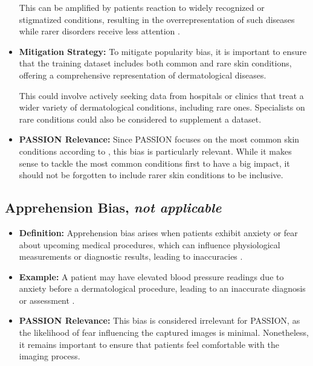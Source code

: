 \documentclass[12pt, a4paper, oneside]{book}   	%
\begin{document}
\begin{appendices}
\begin{itemize}
			This can be amplified by patients reaction to widely recognized or stigmatized conditions, resulting in the overrepresentation of such diseases while rarer disorders receive less attention \autocite{Chakraborty_2024}.
			\item \textbf{Mitigation Strategy:} To mitigate popularity bias, it is important to ensure that the training dataset includes both common and rare skin conditions, offering a comprehensive representation of dermatological diseases.
			
			This could involve actively seeking data from hospitals or clinics that treat a wider variety of dermatological conditions, including rare ones. Specialists on rare conditions could also be considered to supplement a dataset.
			\item \textbf{PASSION Relevance:} Since PASSION focuses on the most common skin conditions according to \textcite{Gottfrois2024}, this bias is particularly relevant. While it makes sense to tackle the most common conditions first to have a big impact, it should not be forgotten to include rarer skin conditions to be inclusive.
		\end{itemize}
		
		\subsection{Apprehension Bias, \textit{not applicable}}
		\begin{itemize}
			\item \textbf{Definition:} Apprehension bias arises when patients exhibit anxiety or fear about upcoming medical procedures, which can influence physiological measurements or diagnostic results, leading to inaccuracies \autocite{Chakraborty_2024}.
			\item \textbf{Example:} A patient may have elevated blood pressure readings due to anxiety before a dermatological procedure, leading to an inaccurate diagnosis or assessment \autocite{Chakraborty_2024}.
			\item \textbf{PASSION Relevance:} This bias is considered irrelevant for PASSION, as the likelihood of fear influencing the captured images is minimal. Nonetheless, it remains important to ensure that patients feel comfortable with the imaging process.
		\end{itemize}
		

\end{appendices}
\end{document}
